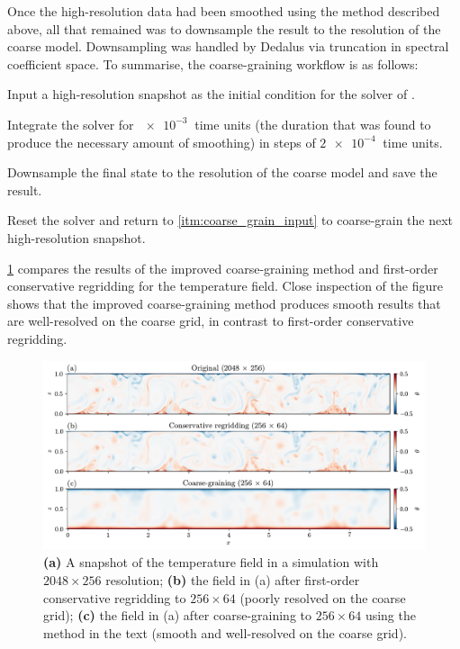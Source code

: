 \documentclass[../main.tex]{subfiles}
\begin{document}
Once the high-resolution data had been smoothed using the method described
above, all that remained was to downsample the result to the resolution of the
coarse model. Downsampling was handled by Dedalus via truncation in spectral
coefficient space. To summarise, the coarse-graining workflow is as follows:
\begin{steps}
    \item\label{itm:coarse_grain_input} Input a high-resolution snapshot
        as the initial condition for the solver of
        .
    \item Integrate the solver for $\SI{e-3}{}$ time units (the duration that
        was found to produce the necessary amount of smoothing) in steps of
        $\SI{2e-4}{}$ time units.
    \item Downsample the final state to the resolution of the coarse model
        and save the result.
    \item Reset the solver and return to \cref{itm:coarse_grain_input} to
        coarse-grain the next high-resolution snapshot.
\end{steps}

\cref{fig:coarse_graining_example} compares the results of the improved
coarse-graining method and first-order conservative regridding for the
temperature field. Close inspection of the figure shows that the improved
coarse-graining method produces smooth results that are well-resolved on the
coarse grid, in contrast to first-order conservative regridding.

\begin{figure}[ht]
    \centering
    \includegraphics[width=\linewidth]{figures/coarse_graining_example.pdf}
    \caption{
        \textbf{(a)} A snapshot of the temperature field in a simulation with
        $2048 \times 256$ resolution; \textbf{(b)} the field in (a) after
        first-order conservative regridding to $256 \times 64$ (poorly
        resolved on the coarse grid); \textbf{(c)} the field in (a) after
        coarse-graining to $256 \times 64$ using the method in the text
        (smooth and well-resolved on the coarse grid).
    }
    \label{fig:coarse_graining_example}
\end{figure}
\end{document}
